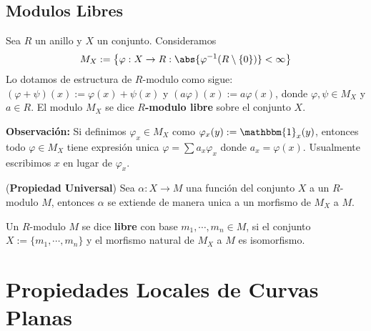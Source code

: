 \documentclass{article}
\begin{document}
\subsection{Modulos Libres}
\begin{dfn}
    Sea $R$ un anillo y $X$ un conjunto. Consideramos
    \begin{equation*}
        M_{X}:=\left\{\varphi:X\to R:\abs{\varphi^{-1}(R\setminus\{0\})}<\infty\right\}
    \end{equation*}
    Lo dotamos de estructura de $R$-modulo como sigue: $(\varphi+\psi)(x):=\varphi(x)+\psi(x)$ y
    $(a\varphi)(x):=a\varphi(x)$, donde $\varphi,\psi\in M_{X}$ y $a\in R$. El modulo $M_{X}$ se
    dice \textbf{$R$-modulo libre} sobre el conjunto $X$.
\end{dfn}
\noindent\textbf{Observación:} Si definimos $\varphi_{x}\in M_{X}$ como 
$\varphi_{x}(y):=\mathbbm{1}_{x}(y)$, entonces todo $\varphi\in M_{X}$ tiene expresión unica
$\varphi=\sum a_{x}\varphi_{x}$ donde $a_{x}=\varphi(x)$. Usualmente escribimos $x$ en lugar de 
$\varphi_{x}$.
\begin{prop}
    (\textbf{Propiedad Universal}) Sea $\alpha:X\to M$ una función del conjunto $X$ a un $R$-modulo
    $M$, entonces $\alpha$ se extiende de manera unica a un morfismo de $M_{X}$ a $M$.
\end{prop}
\begin{dfn}
    Un $R$-modulo $M$ se dice \textbf{libre} con base $m_{1},\cdots,m_{n}\in M$, si el conjunto
    $X:=\{m_{1},\cdots,m_{n}\}$ y el morfismo natural de $M_{X}$ a $M$ es isomorfismo.
\end{dfn}

\newpage
\section{Propiedades Locales de Curvas Planas}
\end{document}
